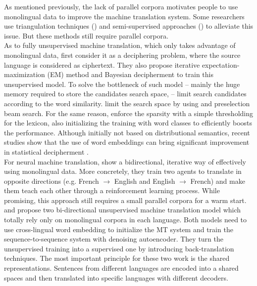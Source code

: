 As mentioned previously, the lack of parallel corpora motivates people to use monolingual data to improve the machine translation system. Some researchers use triangulation techniques (\cite{cohn2007machine}) and semi-supervised approaches (\cite{cheng2016semi}) to alleviate this issue. But these methods still require parallel corpora.\\
As to fully unsupervised machine translation, which only takes advantage of monolingual data, \cite{ravi2011deciphering} first consider it as a deciphering problem, where the source language is considered as ciphertext. They also propose iterative expectation-maximization (EM) method and Bayesian decipherment to train this unsupervised model. To solve the bottleneck of such model -- mainly the huge memory required to store the candidates search space, -- \cite{nuhn2012deciphering} limit search candidates according to the word similarity. \cite{nuhn2014decipherment} limit the search space by using and preselection beam search. For the same reason, \cite{kim2017unsupervised} enforce the sparsity with a simple thresholding for the lexicon, also initializing the training with word classes to efficiently boosts the performance. 
Although initially not based on distributional semantics, recent studies show that the use of word embeddings can bring significant improvement in statistical decipherment \cite{duong2016learning}.\\
For neural machine translation, \cite{he2016dual} show a bidirectional, iterative way of effectively using monolingual data. More concretely, they train two agents to translate in opposite directions (e.g. French ${\rightarrow}$ English and English ${\rightarrow}$ French) and make them teach each other through a reinforcement learning process. While promising, this approach still requires a small parallel corpora for a warm start.  
\cite{artetxe2017unsupervised} and \cite{lample2017unsupervised} propose two bi-directional unsupervised machine translation model which totally rely only on monolingual corpora in each language. Both models  need to use cross-lingual word embedding to initialize the MT system and train the sequence-to-sequence system with denoising autoencoder. They turn the unsupervised training into a supervised one by introducing back-translation techniques. The most important principle for these two work is the shared representations. Sentences from different languages are encoded into a shared spaces and then translated into specific languages with different decoders.

